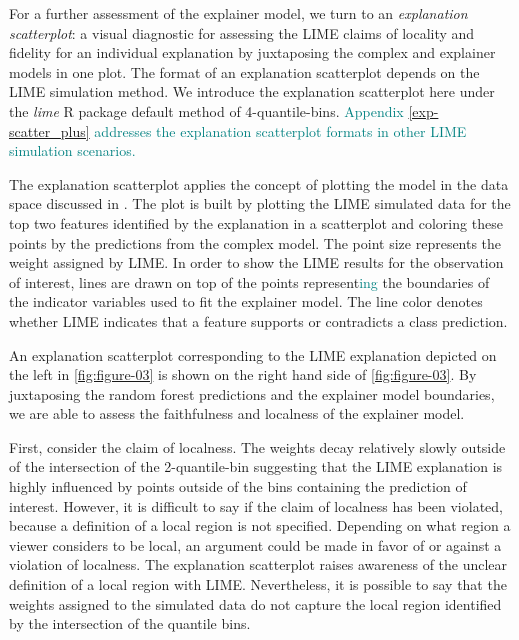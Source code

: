 \documentclass[AMS,STIX2COL]{WileyNJD-v2}\usepackage[]{graphicx}\usepackage[]{color}
\newcommand{\kge}[1]{\textcolor{teal}{#1}}
\renewcommand{\sout}[1]{\unskip}
\begin{document}
For a further assessment of the explainer model, we turn to an \emph{explanation scatterplot}: a visual diagnostic for assessing the LIME claims of locality and fidelity for an individual explanation by juxtaposing the complex and explainer models in one plot. The format of an explanation scatterplot depends on the LIME simulation method. We introduce the explanation scatterplot here under the \emph{lime} R package default method of 4-quantile-bins. \kge{Appendix \ref{exp-scatter_plus} addresses the explanation scatterplot formats in other LIME simulation scenarios.}

The explanation scatterplot applies the concept of plotting the model in the data space discussed in \citet{wickham:2015}. The plot is built by plotting the LIME simulated data for the top two features identified by the explanation in a scatterplot and coloring these points by the predictions from the complex model. The point size represents the weight assigned by LIME. In order to show the LIME results for the observation of interest, lines are drawn on top of the points\sout{. These lines}  represent\kge{ing} the boundaries of the indicator variables used to fit the explainer model. The line color  denotes whether LIME indicates that a feature supports or contradicts a class prediction. \sout{Appendix \ref{exp-scatter_plus} addresses the explanation scatterplot formats in other LIME simulation scenarios.}

An explanation scatterplot corresponding to the LIME explanation depicted on the left in \autoref{fig:figure-03} is shown on the right hand side of \autoref{fig:figure-03}. By juxtaposing the random forest predictions and the explainer model boundaries, we are able to assess the faithfulness and localness of the explainer model. 

First, consider the claim of localness. The weights decay relatively slowly outside of the intersection of the 2-quantile-bin suggesting that the LIME explanation is highly influenced by points outside of the bins containing the prediction of interest. However, it is difficult to say if the claim of localness has been violated, because a definition of a local region is not specified. Depending on what region a viewer considers to be local, an argument could be made in favor of or against a violation of localness. The explanation scatterplot raises awareness of the unclear definition of a local region with LIME. Nevertheless, it is possible to say that the weights assigned to the simulated data do not capture  the local region identified by the intersection of the quantile bins.
\end{document}
